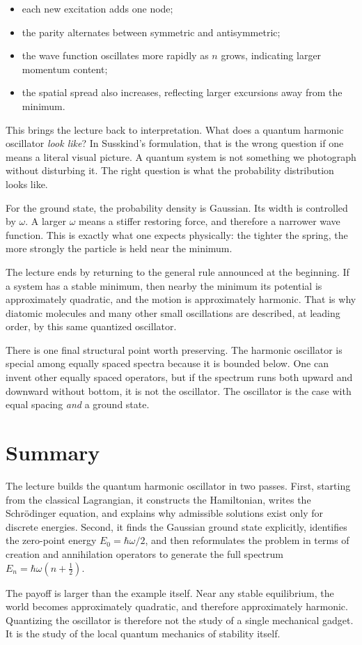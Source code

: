 \begin{itemize}
\item each new excitation adds one node;
\item the parity alternates between symmetric and antisymmetric;
\item the wave function oscillates more rapidly as \(n\) grows, indicating larger momentum content;
\item the spatial spread also increases, reflecting larger excursions away from the minimum.
\end{itemize}

This brings the lecture back to interpretation. What does a quantum harmonic oscillator \emph{look like}? In Susskind's formulation, that is the wrong question if one means a literal visual picture. A quantum system is not something we photograph without disturbing it. The right question is what the probability distribution looks like.

For the ground state, the probability density is Gaussian. Its width is controlled by \(\omega\). A larger \(\omega\) means a stiffer restoring force, and therefore a narrower wave function. This is exactly what one expects physically: the tighter the spring, the more strongly the particle is held near the minimum.

The lecture ends by returning to the general rule announced at the beginning. If a system has a stable minimum, then nearby the minimum its potential is approximately quadratic, and the motion is approximately harmonic. That is why diatomic molecules and many other small oscillations are described, at leading order, by this same quantized oscillator.

There is one final structural point worth preserving. The harmonic oscillator is special among equally spaced spectra because it is bounded below. One can invent other equally spaced operators, but if the spectrum runs both upward and downward without bottom, it is not the oscillator. The oscillator is the case with equal spacing \emph{and} a ground state.

\section{Summary}

The lecture builds the quantum harmonic oscillator in two passes. First, starting from the classical Lagrangian, it constructs the Hamiltonian, writes the Schr\"odinger equation, and explains why admissible solutions exist only for discrete energies. Second, it finds the Gaussian ground state explicitly, identifies the zero-point energy \(E_{0}=\hbar\omega/2\), and then reformulates the problem in terms of creation and annihilation operators to generate the full spectrum
\(
E_{n}=\hbar\omega(n+\tfrac{1}{2}).
\)

The payoff is larger than the example itself. Near any stable equilibrium, the world becomes approximately quadratic, and therefore approximately harmonic. Quantizing the oscillator is therefore not the study of a single mechanical gadget. It is the study of the local quantum mechanics of stability itself.